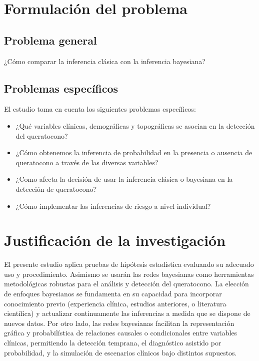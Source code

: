 \section{Formulación del problema}
\subsection{Problema general}
¿Cómo comparar la inferencia clásica con la inferencia bayesiana?

\subsection{Problemas específicos}
El estudio toma en cuenta los siguientes problemas específicos:

\begin{itemize}
	\item ¿Qué variables clínicas, demográficas y topográficas se asocian en la detección del queratocono?
	\item ¿Cómo obtenemos la inferencia de probabilidad en la presencia o ausencia de queratocono a través de las diversas variables?
	\item ¿Como afecta la decisión de usar la inferencia clásica o bayesiana en la detección de queratocono?
	\item ¿Cómo implementar las inferencias de riesgo a nivel individual?
\end{itemize}

\section{Justificación de la investigación}
El presente estudio aplica pruebas de hipótesis estadística evaluando su adecuado uso y procedimiento. Asimismo se usarán las redes bayesianas como herramientas metodológicas robustas para el análisis y detección del queratocono. La elección de enfoques bayesianos se fundamenta en su capacidad para incorporar conocimiento previo (experiencia clínica, estudios anteriores, o literatura científica) y actualizar continuamente las inferencias a medida que se dispone de nuevos datos. Por otro lado, las redes bayesianas facilitan la representación gráfica y probabilística de relaciones causales o condicionales entre variables clínicas, permitiendo la detección temprana, el diagnóstico asistido por probabilidad, y la simulación de escenarios clínicos bajo distintos supuestos.

